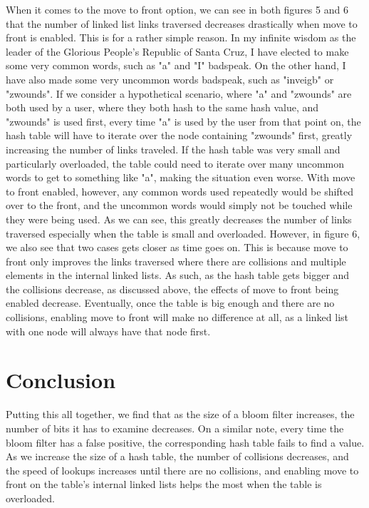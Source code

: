 \documentclass[11pt]{article}
\begin{document}
When it comes to the move to front option, we can see in both figures 5 and 6 that the number of linked list links traversed decreases drastically when move to front is enabled. This is for a rather simple reason. In my infinite wisdom as the leader of the Glorious People's Republic of Santa Cruz, I have elected to make some very common words, such as "a" and "I" badspeak. On the other hand, I have also made some very uncommon words badspeak, such as "inveigb" or "zwounds". If we consider a hypothetical scenario, where "a" and "zwounds" are both used by a user, where they both hash to the same hash value, and "zwounds" is used first, every time "a" is used by the user from that point on, the hash table will have to iterate over the node containing "zwounds" first, greatly increasing the number of links traveled. If the hash table was very small and particularly overloaded, the table could need to iterate over many uncommon words to get to something like "a", making the situation even worse. With move to front enabled, however, any common words used repeatedly would be shifted over to the front, and the uncommon words would simply not be touched while they were being used. As we can see, this greatly decreases the number of links traversed especially when the table is small and overloaded. However, in figure 6, we also see that two cases gets closer as time goes on. This is because move to front only improves the links traversed where there are collisions and multiple elements in the internal linked lists. As such, as the hash table gets bigger and the collisions decrease, as discussed above, the effects of move to front being enabled decrease. Eventually, once the table is big enough and there are no collisions, enabling move to front will make no difference at all, as a linked list with one node will always have that node first.

\section{Conclusion}

Putting this all together, we find that as the size of a bloom filter increases, the number of bits it has to examine decreases. On a similar note, every time the bloom filter has a false positive, the corresponding hash table fails to find a value. As we increase the size of a hash table, the number of collisions decreases, and the speed of lookups increases until there are no collisions, and enabling move to front on the table's internal linked lists helps the most when the table is overloaded.
\end{document}
